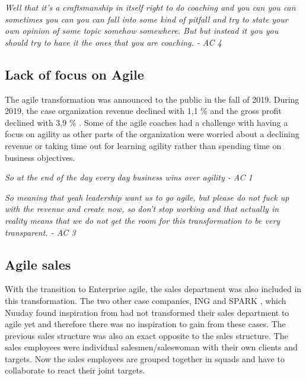 \documentclass[11pt,a4paper]{report}
\begin{document}
\begin{displayquote}
\textit{
Well that it's a craftsmanship in itself right to do coaching and you can you can sometimes you can you can fall into some kind of pitfall and try to state your own opinion of some topic somehow somewhere. But but instead it you you should try to have it the ones that you are coaching. - AC 4
}
\end{displayquote}

\subsection{Lack of focus on Agile}
The agile transformation was announced to the public in the fall of 2019. During 2019, the case organization revenue declined with 1,1 \% and the gross profit declined with 3,9 \% \cite{tdcGroupAnnualReport}. Some of the agile coaches had a challenge with having a focus on agility as other parts of the organization were worried about a declining revenue or taking time out for learning agility rather than spending time on business objectives.

\begin{displayquote}
\textit{
So at the end of the day every day business wins over agility - AC 1
}
\end{displayquote}

\begin{displayquote}
\textit{
So meaning that yeah leadership want us to go agile, but please do not fuck up with the revenue and create now, so don't stop working and that actually in reality means that we do not get the room for this transformation to be very transparent. - AC 3
}
\end{displayquote}

\subsection{Agile sales}
With the transition to Enterprise agile, the sales department was also included in this transformation. The two other case companies, ING \cite{ingWebsite} and SPARK \cite{sparkWebsite}, which Nuuday found inspiration from had not transformed their sales department to agile yet and therefore there was no inspiration to gain from these cases. The previous sales structure was also an exact opposite to the sales structure. The sales employees were individual salesmen/saleswoman with their own clients and targets. Now the sales employees are grouped together in squads and have to collaborate to react their joint targets.
\end{document}
